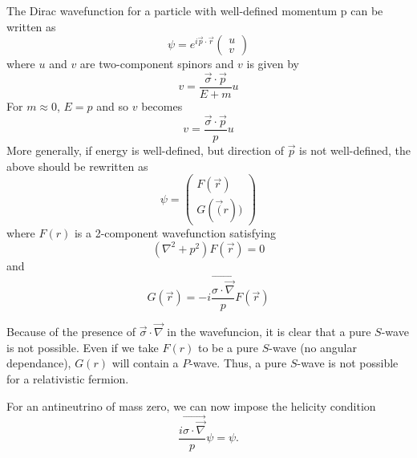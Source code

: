The Dirac wavefunction for a particle with well-defined momentum p can be written as
\begin{equation}
\psi = e^{i \vec{p}\cdot \vec{r}}\begin{pmatrix}
u\\
v
\end{pmatrix}\label{eq-5}
\end{equation}
where $u$ and $v$ are two-component spinors and $v$ is given by
\begin{equation}
v = \frac{\vec{\sigma} \cdot \vec{p}}{E + m}u\label{eq-6}
\end{equation}
For $m \approx 0$, $E=p$ and so $v$ becomes
\begin{equation}
v=\frac{\vec{\sigma} \cdot \vec{p}}{p}u\label{eq-7}
\end{equation}
More generally, if energy is well-defined, but direction of $\vec{p}$ is not well-defined, the above
should be rewritten as
\begin{equation}
\psi = \begin{pmatrix}
F(\vec{r})\\
G(\vec(r))
\end{pmatrix}\label{eq-8}
\end{equation}
where $F(r)$ is a 2-component wavefunction satisfying
\begin{equation}
(\nabla^{2} + p^{2}) F(\vec{r}) =0\label{eq-9}
\end{equation}
and
\begin{equation}
G(\vec{r}) = -i \frac{\vec{\sigma \cdot \vec{\nabla}}}{p} F(\vec{r})\label{eq-10}
\end{equation}

Because of the presence of $\vec{\sigma} \cdot \vec{\nabla}$ in the wavefuncion, it is clear that a pure $S$-wave is not
possible. Even if we take $F(r)$ to be a pure $S$-wave (no angular dependance), $G(r)$ will
contain a $P$-wave. Thus, a pure $S$-wave is not possible for a relativistic fermion.

For an antineutrino of mass zero, we can now impose the helicity condition
\begin{equation}
\frac{i\vec{\sigma \cdot \vec{\nabla}}}{p}\psi = \psi.\label{eq-11}
\end{equation}

